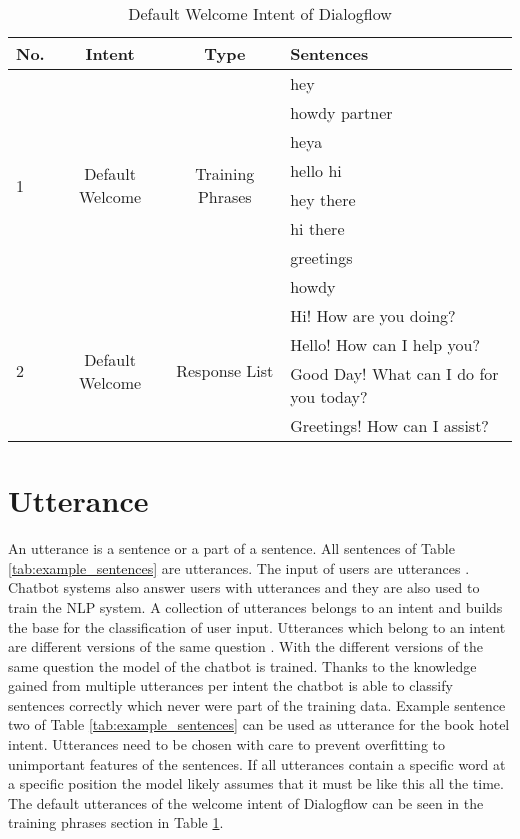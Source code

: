 \begin{table}[H]
    \centering
    \begin{tabular}{ l | c | c | l }
  No. & Intent & Type & Sentences \\ \hline \hline
  \multirow{8}{*}{1}
  & \multirow{8}{*}{Default Welcome} & \multirow{8}{*}{Training Phrases} & hey \\
      & & & howdy partner\\
      & & & heya\\ 
      & & & hello hi\\ 
      & & & hey there\\ 
      & & & hi there\\ 
      & & & greetings\\ 
      & & & howdy \\ \hline
  \multirow{4}{*}{2}
  & \multirow{4}{*}{Default Welcome} & \multirow{4}{*}{Response List} & Hi! How are you doing? \\
      & & & Hello! How can I help you?\\
      & & & Good Day! What can I do for you today?\\ 
      & & & Greetings! How can I assist?\\ \hline
\end{tabular}
    \caption{Default Welcome Intent of Dialogflow} \label{tab:defaultwelcomedialogflow}
\end{table} \noindent



\section{Utterance} \label{sec:utterance}
An utterance is a sentence or a part of a sentence.
All sentences of Table \ref{tab:example_sentences} are utterances.
The input of users are utterances \cite{singhbuilding, dutta2017developing}.
Chatbot systems also answer users with utterances and they are also used to train the NLP system.
A collection of utterances belongs to an intent and builds the base for the classification of user input.
Utterances which belong to an intent are different versions of the same question \cite{buiildChatbotsPython}.
With the different versions of the same question the model of the chatbot is trained.
Thanks to the knowledge gained from multiple utterances per intent the chatbot is able to
classify sentences correctly which never were part of the training data.
Example sentence two of Table \ref{tab:example_sentences} can be used as utterance for the book hotel intent.
Utterances need to be chosen with care to prevent overfitting to unimportant features of the sentences.
If all utterances contain a specific word at a specific position the model likely assumes that it must be like this all the time.
The default utterances of the welcome intent of Dialogflow can be seen in the training phrases section in Table \ref{tab:defaultwelcomedialogflow}.

